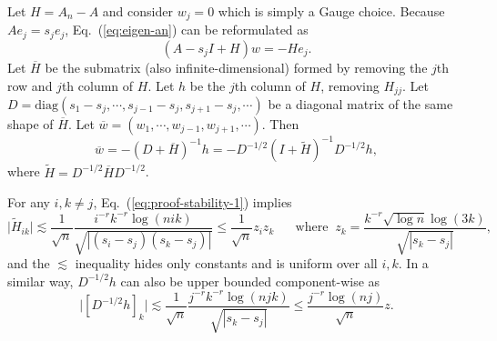 \documentclass[aos]{imsart}
\renewcommand{\tilde}{\widetilde}
\renewcommand{\bar}{\overline}
\newcommand{\diag}{\mathrm{diag}}
\theoremstyle{plain}
\theoremstyle{definition}
\theoremstyle{definition}
\begin{document}
\begin{appendix}
Let $H=A_n-A$ and consider $w_j=0$ which is simply a Gauge choice. Because $Ae_j=s_je_j$, Eq.~(\ref{eq:eigen-an}) can be reformulated as
$$
(A-s_j I+H)w = -He_j.
$$
Let $\bar H$ be the submatrix (also infinite-dimensional) formed by removing the $j$th row and $j$th column of $H$. Let $h$ be the $j$th column of $H$, removing $H_{jj}$.
Let $D=\diag(s_1-s_j,\cdots,s_{j-1}-s_j,s_{j+1}-s_j,\cdots)$ be a diagonal matrix of the same shape of $\bar H$. 
Let $\bar w=(w_1,\cdots,w_{j-1},w_{j+1},\cdots)$. Then
$$
\bar w = -(D+\bar H)^{-1}h = -D^{-1/2}(I+\tilde H)^{-1}D^{-1/2}h,
$$
where $\tilde H = D^{-1/2} \bar H D^{-1/2}$. 

For any $i,k\neq j$, Eq.~(\ref{eq:proof-stability-1}) implies
$$
\big|\tilde H_{ik}\big| \lesssim \frac{1}{\sqrt{n}} \frac{i^{-r}k^{-r}\log(nik)}{\sqrt{|(s_i-s_j)(s_k-s_j)|}} \leq \frac{1}{\sqrt{n}}z_iz_k\;\;\;\;\;\;\text{where}\;\; z_k = \frac{k^{-r}{\sqrt{\log n}\log(3k)}}{\sqrt{|s_k-s_j|}},
$$
and the $\lesssim$ inequality hides only constants and is uniform over all $i,k$.
In a similar way, $D^{-1/2}h$ can also be upper bounded component-wise as
\begin{equation}
\big|[D^{-1/2}h]_k \big| \lesssim  \frac{1}{\sqrt{n}}\frac{j^{-r}k^{-r}\log(njk)}{\sqrt{|s_k-s_j|}}\leq \frac{j^{-r}\log(nj)}{\sqrt{n}}z.
\label{eq:proof-stability-3}
\end{equation}


\end{appendix}
\end{document}
